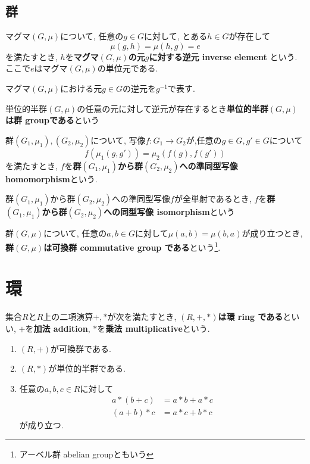 \subsection{群}
\begin{Def}
マグマ$(G,\mu)$について, 任意の$g\in G$に対して, とある$h\in G$が存在して \[\mu(g,h)=\mu(h,g)=e\]を満たすとき, $h$を{\bf マグマ$(G,\mu)$の元$g$に対する逆元 inverse element }という.
ここで$e$はマグマ$(G,\mu)$の単位元である.
\end{Def}
\begin{Notation}
マグマ$(G,\mu)$における元$g\in G$の逆元を$g^{-1}$で表す.
\end{Notation}
\begin{Def}
単位的半群$(G,\mu)$の任意の元に対して逆元が存在するとき{\bf 単位的半群$(G,\mu)$は群 groupである}という
\end{Def}
\begin{Def}
群$(G_1,\mu_1),(G_2,\mu_2)$について, 写像$f:G_1\rightarrow G_2$が,任意の$g\in G, g'\in G$について \[f(\mu_1(g,g')) = \mu_2(f(g),f(g'))\] を満たすとき, $f$を{\bf 群$(G_1,\mu_1)$から群$(G_2,\mu_2)$への準同型写像 homomorphism}という.
\end{Def}
\begin{Def}
群$(G_1,\mu_1)$から群$(G_2,\mu_2)$への準同型写像$f$が全単射であるとき,
$f$を{\bf 群$(G_1,\mu_1)$から群$(G_2,\mu_2)$への同型写像 isomorphism}という
\end{Def}
\begin{Def}
群$(G,\mu)$について,
任意の$a,b\in G$に対して$\mu(a,b)=\mu(b,a)$が成り立つとき,
{\bf 群$(G,\mu)$は可換群 commutative group である}という\footnote{アーベル群 abelian groupともいう}.
\end{Def}
\begin{comment}
\begin{Def}
位相空間$X$と自然数$n$に対して次の手続きで決定されるアーベル群$H_n(X)$を{\bf$n$次 ホモロジー群}と呼ぶ

...

\end{Def}
\end{comment}

\section{環}
\begin{Def}
集合$R$と$R$上の二項演算$+,*$が次を満たすとき, {\bf $(R,+,*)$は環 ring である}といい, $+$を{\bf 加法 addition}, $*$を{\bf 乗法 
multiplicative}という. 
\begin{enumerate}
\item $(R,+)$が可換群である.
\item $(R,*)$が単位的半群である.
\item 任意の$a,b,c\in R$に対して
\begin{align*}
a*(b+c)&=a*b+a*c\\
(a+b)*c&=a*c+b*c
\end{align*}
が成り立つ.
\end{enumerate}
\end{Def}


